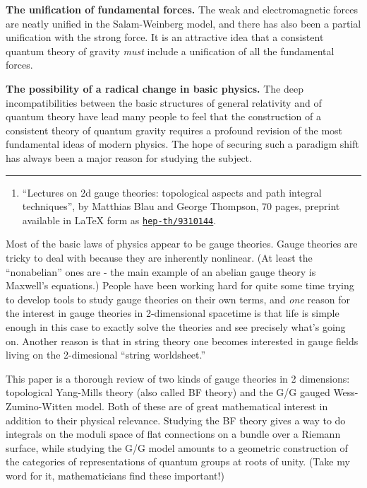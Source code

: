\documentclass{article}
\def\tightlist{}
\begin{document}
\textbf{The unification of fundamental forces.} The weak and
electromagnetic forces are neatly unified in the Salam-Weinberg model,
and there has also been a partial unification with the strong force. It
is an attractive idea that a consistent quantum theory of gravity
\emph{must} include a unification of all the fundamental forces.

\textbf{The possibility of a radical change in basic physics.} The deep
incompatibilities between the basic structures of general relativity and
of quantum theory have lead many people to feel that the construction of
a consistent theory of quantum gravity requires a profound revision of
the most fundamental ideas of modern physics. The hope of securing such
a paradigm shift has always been a major reason for studying the
subject.

\begin{center}\rule{0.5\linewidth}{0.5pt}\end{center}

\begin{enumerate}
\def\labelenumi{\arabic{enumi})}
\setcounter{enumi}{1}
\tightlist
\item
  ``Lectures on 2d gauge theories: topological aspects and path integral
  techniques'', by Matthias Blau and George Thompson, 70 pages, preprint
  available in LaTeX form as
  \href{http://xxx.lanl.gov/abs/hep-th/9310144}{\texttt{hep-th/9310144}}.
\end{enumerate}

Most of the basic laws of physics appear to be gauge theories. Gauge
theories are tricky to deal with because they are inherently nonlinear.
(At least the ``nonabelian'' ones are - the main example of an abelian
gauge theory is Maxwell's equations.) People have been working hard for
quite some time trying to develop tools to study gauge theories on their
own terms, and \emph{one} reason for the interest in gauge theories in
2-dimensional spacetime is that life is simple enough in this case to
exactly solve the theories and see precisely what's going on. Another
reason is that in string theory one becomes interested in gauge fields
living on the 2-dimesional ``string worldsheet.''

This paper is a thorough review of two kinds of gauge theories in 2
dimensions: topological Yang-Mills theory (also called BF theory) and
the G/G gauged Wess-Zumino-Witten model. Both of these are of great
mathematical interest in addition to their physical relevance. Studying
the BF theory gives a way to do integrals on the moduli space of flat
connections on a bundle over a Riemann surface, while studying the G/G
model amounts to a geometric construction of the categories of
representations of quantum groups at roots of unity. (Take my word for
it, mathematicians find these important!)
\end{document}
